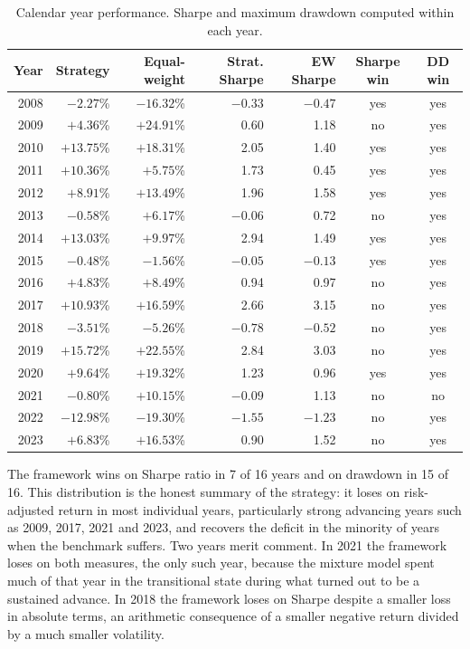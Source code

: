 \begin{table}[!ht]
\centering
\caption{Calendar year performance. Sharpe and maximum drawdown computed within each year.}
\label{tab:years}
\small
\begin{tabular}{rrrrrcc}
\hline
\textbf{Year} & \textbf{Strategy} & \textbf{Equal-weight} & \textbf{Strat. Sharpe} & \textbf{EW Sharpe} & \textbf{Sharpe win} & \textbf{DD win} \\
\hline
2008 & $-2.27$\% & $-16.32$\% & $-0.33$ & $-0.47$ & yes & yes \\
2009 & $+4.36$\% & $+24.91$\% & 0.60 & 1.18 & no & yes \\
2010 & $+13.75$\% & $+18.31$\% & 2.05 & 1.40 & yes & yes \\
2011 & $+10.36$\% & $+5.75$\% & 1.73 & 0.45 & yes & yes \\
2012 & $+8.91$\% & $+13.49$\% & 1.96 & 1.58 & yes & yes \\
2013 & $-0.58$\% & $+6.17$\% & $-0.06$ & 0.72 & no & yes \\
2014 & $+13.03$\% & $+9.97$\% & 2.94 & 1.49 & yes & yes \\
2015 & $-0.48$\% & $-1.56$\% & $-0.05$ & $-0.13$ & yes & yes \\
2016 & $+4.83$\% & $+8.49$\% & 0.94 & 0.97 & no & yes \\
2017 & $+10.93$\% & $+16.59$\% & 2.66 & 3.15 & no & yes \\
2018 & $-3.51$\% & $-5.26$\% & $-0.78$ & $-0.52$ & no & yes \\
2019 & $+15.72$\% & $+22.55$\% & 2.84 & 3.03 & no & yes \\
2020 & $+9.64$\% & $+19.32$\% & 1.23 & 0.96 & yes & yes \\
2021 & $-0.80$\% & $+10.15$\% & $-0.09$ & 1.13 & no & no \\
2022 & $-12.98$\% & $-19.30$\% & $-1.55$ & $-1.23$ & no & yes \\
2023 & $+6.83$\% & $+16.53$\% & 0.90 & 1.52 & no & yes \\
\hline
\end{tabular}
\end{table}

The framework wins on Sharpe ratio in 7 of 16 years and on drawdown in 15 of 16. This
distribution is the honest summary of the strategy: it loses on risk-adjusted return in
most individual years, particularly strong advancing years such as 2009, 2017, 2021 and
2023, and recovers the deficit in the minority of years when the benchmark suffers. Two
years merit comment. In 2021 the framework loses on both measures, the only such year,
because the mixture model spent much of that year in the transitional state during what
turned out to be a sustained advance. In 2018 the framework loses on Sharpe despite a
smaller loss in absolute terms, an arithmetic consequence of a smaller negative return
divided by a much smaller volatility.

